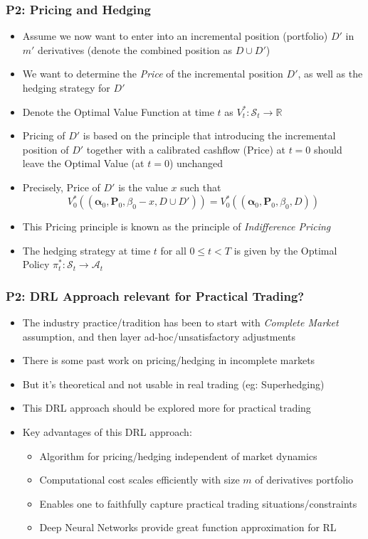 \documentclass[handout]{beamer}
\begin{document}
\begin{frame}
\frametitle{P2: Pricing and Hedging}
\pause
\begin{itemize}[<+->]
\item Assume we now want to enter into an incremental position (portfolio) $D'$ in $m'$ derivatives (denote the combined position as $D \cup D'$)
\item We want to determine the {\em Price} of the incremental position $D'$, as well as the hedging strategy for $D'$
\item Denote the Optimal Value Function at time $t$ as $V_t^* : \mathcal{S}_t \rightarrow \mathbb{R}$
\item Pricing of $D'$ is based on the principle that introducing the incremental position of $D'$ together with a calibrated cashflow (Price) at $t=0$ should leave the Optimal Value (at $t=0$) unchanged
\item Precisely, Price of $D'$ is the value $x$ such that
$$V_0^*((\bm{\alpha}_0, \bm{P}_0, \beta_0 - x, D \cup D')) = V_0^*((\bm{\alpha}_0, \bm{P}_0, \beta_0, D))$$
\item This Pricing principle is known as the principle of {\em Indifference Pricing}
\item The hedging strategy at time $t$ for all $0 \leq t < T$ is given by the Optimal Policy $\pi_t^* : \mathcal{S}_t \rightarrow \mathcal{A}_t$
\end{itemize}
\end{frame}

\begin{frame}
\frametitle{P2: DRL Approach relevant for Practical Trading?}
\pause
\begin{itemize}[<+->]
\item The industry practice/tradition has been to start with {\em Complete Market} assumption, and then layer ad-hoc/unsatisfactory adjustments
\item There is some past work on pricing/hedging in incomplete markets
\item But it's theoretical and not usable in real trading (eg: Superhedging)
\item This DRL approach should be explored more for practical trading
\item Key advantages of this DRL approach:
\begin{itemize}
\item Algorithm for pricing/hedging independent of market dynamics
\item Computational cost scales efficiently with size $m$ of derivatives portfolio
\item Enables one to faithfully capture practical trading situations/constraints
\item Deep Neural Networks provide great function approximation for RL 
\end{itemize}
\end{itemize}
\end{frame}
\end{document}
